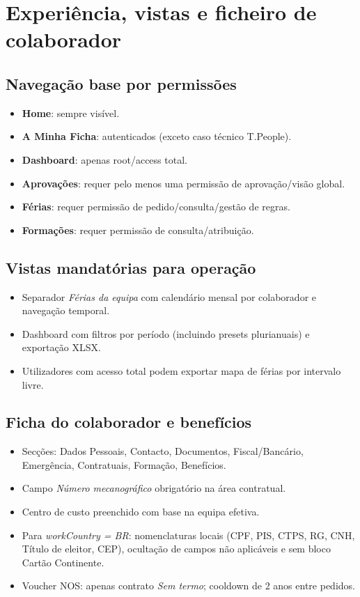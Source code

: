 \documentclass[11pt,a4paper,twoside]{article}
\begin{document}
\section{Experiência, vistas e ficheiro de colaborador}

\subsection{Navegação base por permissões}
\begin{itemize}
  \item \textbf{Home}: sempre visível.
  \item \textbf{A Minha Ficha}: autenticados (exceto caso técnico T.People).
  \item \textbf{Dashboard}: apenas root/access total.
  \item \textbf{Aprovações}: requer pelo menos uma permissão de aprovação/visão global.
  \item \textbf{Férias}: requer permissão de pedido/consulta/gestão de regras.
  \item \textbf{Formações}: requer permissão de consulta/atribuição.
\end{itemize}

\subsection{Vistas mandatórias para operação}
\begin{itemize}
  \item Separador \textit{Férias da equipa} com calendário mensal por colaborador e navegação temporal.
  \item Dashboard com filtros por período (incluindo presets plurianuais) e exportação XLSX.
  \item Utilizadores com acesso total podem exportar mapa de férias por intervalo livre.
\end{itemize}

\subsection{Ficha do colaborador e benefícios}
\begin{itemize}
  \item Secções: Dados Pessoais, Contacto, Documentos, Fiscal/Bancário, Emergência, Contratuais, Formação, Benefícios.
  \item Campo \textit{Número mecanográfico} obrigatório na área contratual.
  \item Centro de custo preenchido com base na equipa efetiva.
  \item Para \textit{workCountry = BR}: nomenclaturas locais (CPF, PIS, CTPS, RG, CNH, Título de eleitor, CEP), ocultação de campos não aplicáveis e sem bloco Cartão Continente.
  \item Voucher NOS: apenas contrato \textit{Sem termo}; cooldown de 2 anos entre pedidos.
\end{itemize}
\end{document}
